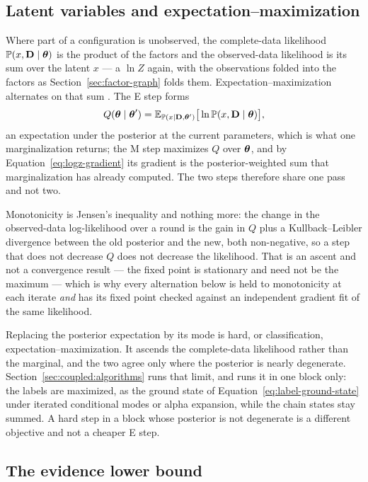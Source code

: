 \documentclass[11pt,a4paper]{article}
\begin{document}
\subsection{Latent variables and expectation--maximization}

Where part of a configuration is unobserved, the complete-data likelihood
$\mathbb{P}(x, \mathbf{D} \mid \boldsymbol{\theta})$ is the product of the factors and the
observed-data likelihood is its sum over the latent $x$ --- a $\ln Z$ again,
with the observations folded into the factors as
Section~\ref{sec:factor-graph} folds them. Expectation--maximization alternates
on that sum \citep{dempster1977}. The E step forms
\[
  Q(\boldsymbol{\theta} \mid \boldsymbol{\theta}')
    = \mathbb{E}_{\mathbb{P}(x \mid \mathbf{D}, \boldsymbol{\theta}')}
      \big[ \ln \mathbb{P}(x, \mathbf{D} \mid \boldsymbol{\theta}) \big],
\]
an expectation under the posterior at the current parameters, which is what one
marginalization returns; the M step maximizes $Q$ over $\boldsymbol{\theta}$, and by
Equation~\ref{eq:logz-gradient} its gradient is the posterior-weighted sum that
marginalization has already computed. The two steps therefore share one pass
and not two.

Monotonicity is Jensen's inequality and nothing more: the change in the
observed-data log-likelihood over a round is the gain in $Q$ plus a
Kullback--Leibler divergence between the old posterior and the new, both
non-negative, so a step that does not decrease $Q$ does not decrease the
likelihood. That is an ascent and not a convergence result --- the fixed point
is stationary and need not be the maximum --- which is why every alternation
below is held to monotonicity at each iterate \emph{and} has its fixed point
checked against an independent gradient fit of the same likelihood.

Replacing the posterior expectation by its mode is hard, or classification,
expectation--maximization. It ascends the complete-data likelihood rather than
the marginal, and the two agree only where the posterior is nearly degenerate.
Section~\ref{sec:coupled:algorithms} runs that limit, and runs it in one block
only: the labels are maximized, as the ground state of
Equation~\ref{eq:label-ground-state} under iterated conditional modes or alpha
expansion, while the chain states stay summed. A hard step in a block whose
posterior is not degenerate is a different objective and not a cheaper E step.

\subsection{The evidence lower bound}
\end{document}
